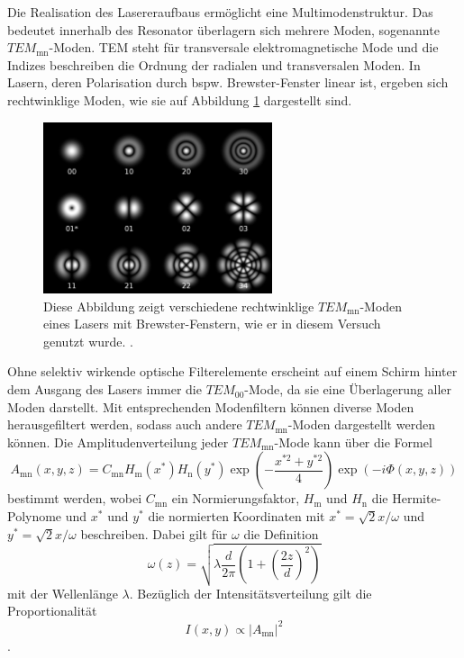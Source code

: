 Die Realisation des Lasereraufbaus ermöglicht eine Multimodenstruktur. Das bedeutet 
innerhalb des Resonator überlagern sich mehrere Moden, sogenannte 
$TEM_{\text{mn}}$-Moden. TEM steht für transversale elektromagnetische Mode und die 
Indizes beschreiben die Ordnung der radialen und transversalen Moden.
In Lasern, deren Polarisation durch bspw. Brewster-Fenster linear ist, ergeben sich 
rechtwinklige Moden, wie sie auf Abbildung \ref{abb3} dargestellt sind.
\begin{figure}
    \centering
    \includegraphics[width=0.6\textwidth]{figure/TEMmoden.pdf}
    \caption{Diese Abbildung zeigt verschiedene rechtwinklige $TEM_{\text{mn}}$-Moden 
    eines Lasers mit Brewster-Fenstern, wie er in diesem Versuch genutzt wurde.
    \cite{TEMmoden}.}
    \label{abb3}
\end{figure}
Ohne selektiv wirkende optische Filterelemente erscheint auf einem Schirm hinter dem 
Ausgang des Lasers immer die $TEM_{\text{00}}$-Mode, da sie eine Überlagerung aller 
Moden darstellt. Mit entsprechenden Modenfiltern 
können diverse Moden herausgefiltert werden, sodass auch andere $TEM_{\text{mn}}$-Moden
dargestellt werden können.
Die Amplitudenverteilung jeder $TEM_{\text{mn}}$-Mode kann über die Formel 
\begin{equation}
    A_{\text{mn}} (x,y,z) = C_{\text{mn}} H_{\text{m}}(x^*) H_{\text{n}}(y^*) \exp(- \frac{x^{*2} + y^{*2}}{ 4} ) \exp(-i\Phi(x,y,z))
    \label{eq5}
\end{equation}
bestimmt werden, wobei $C_{\text{mn}}$ ein Normierungsfaktor, 
$H_{\text{m}}$ und $H_{\text{n}}$ die Hermite-Polynome und $x^*$ und $y^*$ die 
normierten Koordinaten mit $x^* = \sqrt{2}x/\omega$ und 
$y^* = \sqrt{2}x/\omega$ beschreiben. Dabei gilt für $\omega$ die Definition
\begin{equation}
    \omega(z) = \sqrt{ \lambda \frac{d}{2 \pi } \left( 1+ \left( \frac{2z}{d} \right)^2 \right) }
\end{equation}
mit der Wellenlänge $\lambda$. 
Bezüglich der Intensitätsverteilung gilt die Proportionalität
\begin{equation}
    I(x,y) \propto |A_{\text{mn}}|^2
    \label{eq6}
\end{equation} 
\cite{1}.
\newpage
